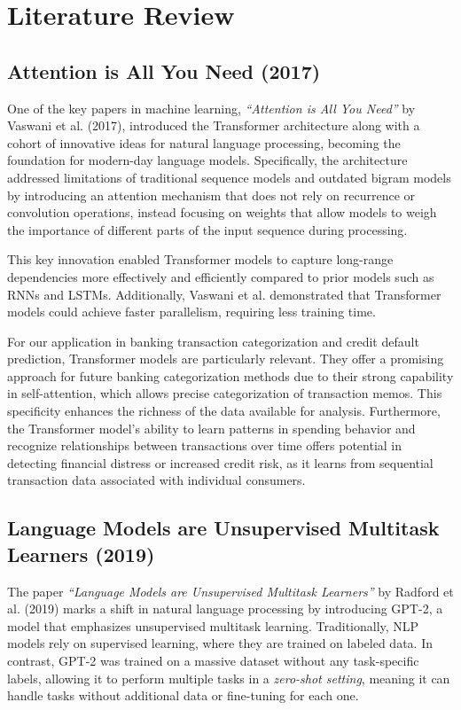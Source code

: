 \documentclass[12pt,letterpaper]{article}
\begin{document}

\section{Literature Review}

\subsection{Attention is All You Need (2017)}

One of the key papers in machine learning, \textit{“Attention is All You Need”} by Vaswani et al. (2017), introduced the Transformer architecture along with a cohort of innovative ideas for natural language processing, becoming the foundation for modern-day language models. Specifically, the architecture addressed limitations of traditional sequence models and outdated bigram models by introducing an attention mechanism that does not rely on recurrence or convolution operations, instead focusing on weights that allow models to weigh the importance of different parts of the input sequence during processing.

This key innovation enabled Transformer models to capture long-range dependencies more effectively and efficiently compared to prior models such as RNNs and LSTMs. Additionally, Vaswani et al. demonstrated that Transformer models could achieve faster parallelism, requiring less training time.

For our application in banking transaction categorization and credit default prediction, Transformer models are particularly relevant. They offer a promising approach for future banking categorization methods due to their strong capability in self-attention, which allows precise categorization of transaction memos. This specificity enhances the richness of the data available for analysis. Furthermore, the Transformer model's ability to learn patterns in spending behavior and recognize relationships between transactions over time offers potential in detecting financial distress or increased credit risk, as it learns from sequential transaction data associated with individual consumers.

\subsection{Language Models are Unsupervised Multitask Learners (2019)}
The paper \textit{“Language Models are Unsupervised Multitask Learners”} by Radford et al. (2019) marks a shift in natural language processing by introducing GPT-2, a model that emphasizes unsupervised multitask learning. Traditionally, NLP models rely on supervised learning, where they are trained on labeled data. In contrast, GPT-2 was trained on a massive dataset without any task-specific labels, allowing it to perform multiple tasks in a \textit{zero-shot setting}, meaning it can handle tasks without additional data or fine-tuning for each one.
\end{document}

